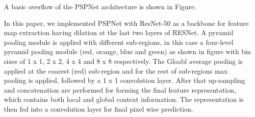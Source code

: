 	A basic overflow of the PSPNet architecture is shown in Figure. \begin{comment}As it is shown in the Figure that the initial feature maps are extracted from input images by employing ResNet architecture along with dilation. A pyramid pooling module is applied with different sub-region representations. After that up-sampling and concatenation are performed for forming the final feature representation, which contains both local and global context information. The representation is then fed into a convolution layer for final pixel wise prediction.\end{comment} 
	In this paper, we implemented PSPNet with ResNet-50 as a backbone for feature map extraction having dilation at the last two layers of RESNet.  A pyramid pooling module is applied with different sub-regions, in this case a four-level pyramid pooling module (red, orange, blue and green) as shown in figure with bin sizes of 1 x 1, 2 x 2, 4 x 4 and 8 x 8 respectively. The Gloabl average pooling is applied at the coarest (red) sub-region and for the rest of sub-regions max pooling is applied, followed by a 1 x 1 convolution layer. After that up-sampling and concatenation are performed for forming the final feature representation, which contains both local and global context information. The representation is then fed into a convolution layer for final pixel wise prediction. 
	
